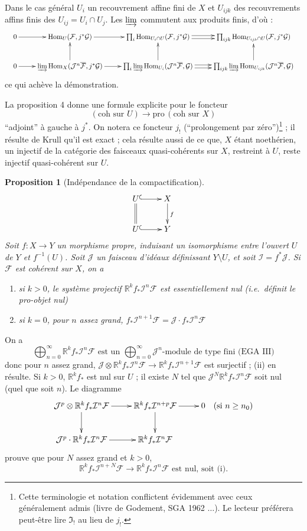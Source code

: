 \documentclass[12pt]{amsart}
\theoremstyle{plain}
\newtheorem{prop}{Proposition}
\theoremstyle{definition}
\DeclareMathOperator{\Hom}{Hom}
\newcommand{\Pro}{\text{pro}\,}
\newcommand{\cF}{\mathcal{F}}
\newcommand{\cG}{\mathcal{G}}
\newcommand{\cI}{\mathcal{I}}
\newcommand{\cJ}{\mathcal{J}}
\newcommand{\bR}{\mathbb{R}}
\begin{document}
Dans le cas g\'en\'eral $U_{i}$ un recouvrement affine fini de $X$ et $U_{ijk}$ des recouvrements affins finis des $U_{ij} = U_{i} \cap U_{j}$. Les $\varinjlim$ commutent aux produits finis, d'o\`u :
\[
\resizebox{\textwidth}{!}{$\xymatrix{
0 \ar[r] & \Hom_{U}(\cF,j^{*}\cG) \ar[r] & \prod_{i} \Hom_{U_{i} \cap U}(\cF,j^{*}\cG) \ar@<.5ex>[r] \ar@<-.5ex>[r] & \prod_{ijk} \Hom_{U_{ijk} \cap U}(\cF,j^{*}\cG) \\
0 \ar[r] & \varinjlim \Hom_{X}(\cJ^{n}\overline{\cF},j^{*}\cG) \ar[r] \ar[u] & \prod_{i} \varinjlim \Hom_{U_{i}}(\cJ^{n}\overline{\cF},\cG) \ar@<.5ex>[r] \ar@<-.5ex>[r] \ar[u] & \prod_{ijk} \varinjlim \Hom_{U_{ijk}}(\cJ^{n}\overline{\cF},\cG) \ar[u]
}$}
\]
ce qui ach\`eve la d\'emonstration.

La proposition 4 donne une formule explicite pour le foncteur
\[
(\text{coh sur } U) \longrightarrow \Pro(\text{coh sur } X)
\]
``adjoint'' \`a gauche \`a $j^{*}$. On notera ce foncteur $j_{!}$ (``prolongement par z\'ero'')\footnote{Cette terminologie et notation conflictent \'evidemment avec ceux g\'en\'eralement admis (livre de Godement, SGA 1962 $\ldots$). Le lecteur pr\'ef\'erera peut-\^etre lire $\mathfrak{I}_{!}$ au lieu de $j_{!}$.} ; il r\'esulte de Krull qu'il est exact ; cela r\'esulte aussi de ce que, $X$ \'etant noeth\'erien, un injectif de la cat\'egorie des faisceaux quasi-coh\'erents sur $X$, restreint \`a $U$, reste injectif quasi-coh\'erent sur $U$.

\begin{prop}[Ind\'ependance de la compactification]
\[
\xymatrix{
U \ar@{^{(}->}[r] \ar@{=}[d] & X \ar[d]^{f} \\
U \ar@{^{(}->}[r] & Y
}
\]
Soit $f: X \to Y$ un morphisme propre, induisant un isomorphisme entre l'ouvert $U$ de $Y$ et $f^{-1}(U)$. Soit $\cJ$ un faisceau d'id\'eaux d\'efinissant $Y \setminus U$, et soit $\cI = f^{*}\cJ$. Si $\cF$ est coh\'erent sur $X$, on a
\begin{enumerate}
\item[(i)] si $k > 0$, le syst\`eme projectif $\bR^{k}f_{*}\cI^{n}\cF$ est essentiellement nul (i.e.\ d\'efinit le pro-objet nul)
\item[(ii)] si $k = 0$, pour $n$ assez grand, $f_{*}\cI^{n+1}\cF = \cJ \cdot f_{*}\cI^{n}\cF$
\end{enumerate}
\end{prop}

On a
\[
\bigoplus_{n=0}^{\infty} \bR^{k}f_{*}\cI^{n}\cF \text{ est un } \bigoplus_{n=0}^{\infty} \cJ^{n}\text{-module de type fini (EGA III)}
\]
donc pour $n$ assez grand, $\cJ \otimes \bR^{k}f_{*}\cI^{n}\cF \to \bR^{k}f_{*}\cI^{n+1}\cF$ est surjectif ; (ii) en r\'esulte. Si $k > 0$, $\bR^{k}f_{*}$ est nul sur $U$ ; il existe $N$ tel que $\cJ^{N}\bR^{k}f_{*}\cI^{n}\cF$ soit nul (quel que soit $n$). Le diagramme
\[
\xymatrix{
\cJ^{p} \otimes \bR^{k}f_{*}\cI^{n}\cF \ar[r] \ar[d] & \bR^{k}f_{*}\cI^{n+p}\cF \ar[r] \ar[d] & 0 \quad (\text{si } n \geq n_{0}) \\
\cJ^{p} \cdot \bR^{k}f_{*}\cI^{n}\cF \ar[r] & \bR^{k}f_{*}\cI^{n}\cF
}
\]
prouve que pour $N$ assez grand et $k > 0$,
\[
\bR^{k}f_{*}\cI^{n+N}\cF \to \bR^{k}f_{*}\cI^{n}\cF \text{ est nul, soit (i).}
\]
\end{document}
